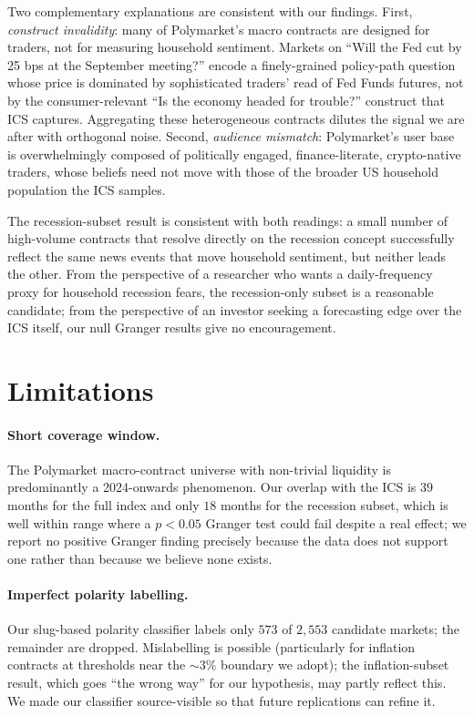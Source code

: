 \documentclass{article}
\begin{document}
Two complementary explanations are consistent with our findings. First,
\emph{construct invalidity}: many of Polymarket's macro contracts are
designed for traders, not for measuring household sentiment. Markets on
``Will the Fed cut by 25 bps at the September meeting?'' encode a
finely-grained policy-path question whose price is dominated by
sophisticated traders' read of Fed Funds futures, not by the
consumer-relevant ``Is the economy headed for trouble?'' construct that
ICS captures. Aggregating these heterogeneous contracts dilutes the
signal we are after with orthogonal noise. Second, \emph{audience
mismatch}: Polymarket's user base is overwhelmingly composed of
politically engaged, finance-literate, crypto-native traders, whose
beliefs need not move with those of the broader US household population
the ICS samples.

The recession-subset result is consistent with both readings: a small
number of high-volume contracts that resolve directly on the
recession concept successfully reflect the same news events that move
household sentiment, but neither leads the other. From the perspective
of a researcher who wants a daily-frequency proxy for household
recession fears, the recession-only subset is a reasonable candidate;
from the perspective of an investor seeking a forecasting edge over the
ICS itself, our null Granger results give no encouragement.

\section{Limitations}

\paragraph{Short coverage window.}
The Polymarket macro-contract universe with non-trivial liquidity is
predominantly a 2024-onwards phenomenon. Our overlap with the ICS is
$39$ months for the full index and only $18$ months for the
recession subset, which is well within range where a $p < 0.05$ Granger
test could fail despite a real effect; we report no positive Granger
finding precisely because the data does not support one rather than
because we believe none exists.

\paragraph{Imperfect polarity labelling.}
Our slug-based polarity classifier labels only $573$ of $2{,}553$
candidate markets; the remainder are dropped. Mislabelling is possible
(particularly for inflation contracts at thresholds near the $\sim 3\%$
boundary we adopt); the inflation-subset result, which goes
``the wrong way'' for our hypothesis, may partly reflect this. We made
our classifier source-visible so that future replications can refine it.
\end{document}
